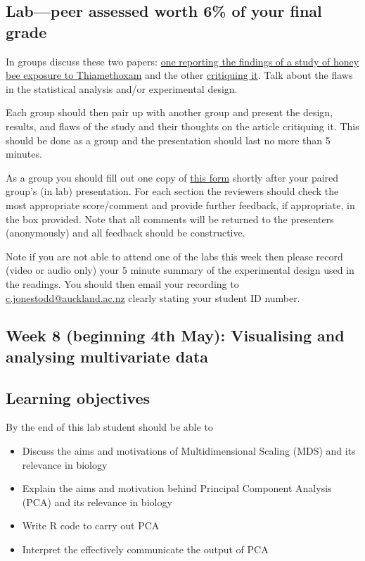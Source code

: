 \documentclass{article}
\begin{document}
\subsection*{Lab---peer assessed worth 6\% of your final grade}

In groups discuss these two papers: \href{https://journals.plos.org/plosone/article?id=10.1371/journal.pone.0077193}{one reporting the findings of a study of honey bee exposure to Thiamethoxam} and the other \href{https://enveurope.springeropen.com/articles/10.1186/s12302-015-0060-7}{critiquing it}. Talk about the flaws in the statistical analysis and/or experimental design.

Each group should then pair up with another group and present the design, results, and flaws of the study and their thoughts on the article critiquing it. This should be done as a group and the presentation should last no more than 5 minutes.

As a group you should fill out one copy of \href{https://docs.google.com/forms/d/e/1FAIpQLSeMZDLBiDVTNzoKR7vAZmHLflN0qcIfFeowIuNclvgDLfDBjg/viewform}{this form} shortly after your paired group's (in lab) presentation. For each section the reviewers should check the most appropriate score/comment and provide further feedback, if appropriate, in the box provided. Note that all comments will be returned to the presenters (anonymously) and all feedback should be constructive.

Note if you are not able to attend one of the labs this week then please record (video or audio only) your 5 minute summary of the experimental design used in the readings. You should then email your recording to \href{mailto:c.jonestodd@auckland.ac.nz}{c.jonestodd@auckland.ac.nz} clearly stating your student ID number.


\newpage

\subsection*{Week 8 (beginning 4th May): Visualising and analysing multivariate data}
\subsection*{Learning objectives}
By the end of this lab student should be able to
\begin{itemize}
\item Discuss the aims and motivations of Multidimensional Scaling (MDS) and its relevance in biology
   \item Explain the aims and motivation behind Principal Component Analysis (PCA) and its relevance in biology
   \item Write R code to carry out PCA
   \item Interpret the effectively communicate the output of PCA
\end{itemize}
\end{document}
